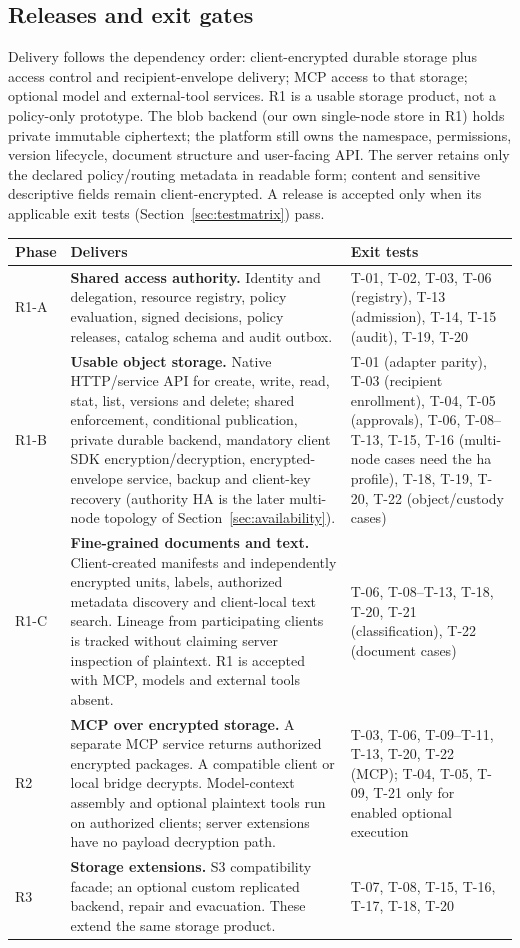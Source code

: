 \documentclass[11pt,a4paper]{article}
\begin{document}
\subsection{Releases and exit gates}\label{sec:releases}
Delivery follows the dependency order: client-encrypted durable storage plus access control and recipient-envelope delivery; MCP access to that storage; optional model and external-tool services. R1 is a usable storage product, not a policy-only prototype. The blob backend (our own single-node store in R1) holds private immutable ciphertext; the platform still owns the namespace, permissions, version lifecycle, document structure and user-facing API. The server retains only the declared policy/routing metadata in readable form; content and sensitive descriptive fields remain client-encrypted. A release is accepted only when its applicable exit tests (Section~\ref{sec:testmatrix}) pass.
\begin{longtable}{@{}P{0.08\textwidth}P{0.50\textwidth}P{0.30\textwidth}@{}}
\toprule Phase & Delivers & Exit tests\\\midrule\endhead
R1-A & \textbf{Shared access authority.} Identity and delegation, resource registry, policy evaluation, signed decisions, policy releases, catalog schema and audit outbox. & T-01, T-02, T-03, T-06 (registry), T-13 (admission), T-14, T-15 (audit), T-19, T-20\\
R1-B & \textbf{Usable object storage.} Native HTTP/service API for create, write, read, stat, list, versions and delete; shared enforcement, conditional publication, private durable backend, mandatory client SDK encryption/decryption, encrypted-envelope service, backup and client-key recovery (authority HA is the later multi-node topology of Section~\ref{sec:availability}). & T-01 (adapter parity), T-03 (recipient enrollment), T-04, T-05 (approvals), T-06, T-08--T-13, T-15, T-16 (multi-node cases need the ha profile), T-18, T-19, T-20, T-22 (object/custody cases)\\
R1-C & \textbf{Fine-grained documents and text.} Client-created manifests and independently encrypted units, labels, authorized metadata discovery and client-local text search. Lineage from participating clients is tracked without claiming server inspection of plaintext. R1 is accepted with MCP, models and external tools absent. & T-06, T-08--T-13, T-18, T-20, T-21 (classification), T-22 (document cases)\\
R2 & \textbf{MCP over encrypted storage.} A separate MCP service returns authorized encrypted packages. A compatible client or local bridge decrypts. Model-context assembly and optional plaintext tools run on authorized clients; server extensions have no payload decryption path. & T-03, T-06, T-09--T-11, T-13, T-20, T-22 (MCP); T-04, T-05, T-09, T-21 only for enabled optional execution\\
R3 & \textbf{Storage extensions.} S3 compatibility facade; an optional custom replicated backend, repair and evacuation. These extend the same storage product. & T-07, T-08, T-15, T-16, T-17, T-18, T-20\\
\bottomrule
\end{longtable}
\end{document}
